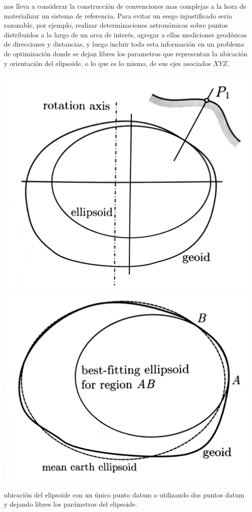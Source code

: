 \documentclass{tufte-book}
\begin{document}
 nos lleva a considerar la construcción
de convenciones mas complejas a la hora de materializar un sistema de referencia. Para evitar un sesgo
injustificado seria razonable, por ejemplo, realizar determinaciones astronómicas sobre puntos distribuidos a lo
largo de un area de interés, agregar a ellas mediciones geodésicas de direcciones y distancias, y luego incluir
toda esta información en un problema de optimización donde se dejan libres los parametros que representan
la ubicación y orientación del elipsoide, o lo que es lo mismo, de sus ejes asociados \(XYZ\).

\begin{marginfigure}
  \label{fig:puntodatum}
  \includegraphics{./imgs/puntodatum.jpg}
  \includegraphics{./imgs/dospuntosdatum.jpg}
  \caption{ubicación del elipsoide con un único punto datum o utilizando dos puntos datum y dejando libres
  los parámetros del elipsoide.}
\end{marginfigure}
\end{document}
